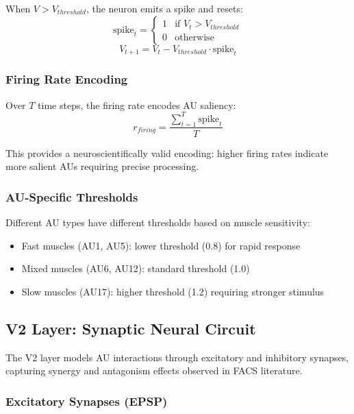 \documentclass[preprint,12pt]{elsarticle}
\begin{document}
When $V > V_{threshold}$, the neuron emits a spike and resets:
\begin{equation}
\text{spike}_t = \begin{cases} 1 & \text{if } V_t > V_{threshold} \\
                              0 & \text{otherwise} \end{cases}
\end{equation}
\begin{equation}
V_{t+1} = V_t - V_{threshold} \cdot \text{spike}_t
\end{equation}

\subsubsection{Firing Rate Encoding}

Over $T$ time steps, the firing rate encodes AU saliency:
\begin{equation}
r_{firing} = \frac{\sum_{t=1}^{T} \text{spike}_t}{T}
\end{equation}

This provides a neuroscientifically valid encoding: higher firing rates
indicate more salient AUs requiring precise processing.

\subsubsection{AU-Specific Thresholds}

Different AU types have different thresholds based on muscle sensitivity:
\begin{itemize}
\item Fast muscles (AU1, AU5): lower threshold (0.8) for rapid response
\item Mixed muscles (AU6, AU12): standard threshold (1.0)
\item Slow muscles (AU17): higher threshold (1.2) requiring stronger stimulus
\end{itemize}

\subsection{V2 Layer: Synaptic Neural Circuit}
\label{sec:v2}

The V2 layer models AU interactions through excitatory and inhibitory synapses,
capturing synergy and antagonism effects observed in FACS literature.

\subsubsection{Excitatory Synapses (EPSP)}
\end{document}
